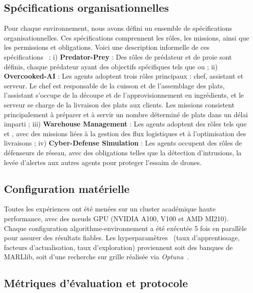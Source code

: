 \documentclass[francais,ROIA,Unicode,manuscript]{cedram}
\begin{document}
\subsection{Spécifications organisationnelles}

Pour chaque environnement, nous avons défini un ensemble de spécifications organisationnelles. Ces spécifications comprennent les rôles, les missions, ainsi que les permissions et obligations. Voici une description informelle de ces spécifications~\hyperref[fn:github]{\footnotemark[2]} :
%
i) \textbf{Predator-Prey} : Des rôles de prédateur et de proie sont définis, chaque prédateur ayant des objectifs spécifiques tels que  ou 
; \quad
ii) \textbf{Overcooked-AI} : Les agents adoptent trois rôles principaux : chef, assistant et serveur. Le chef est responsable de la cuisson et de l'assemblage des plats, l'assistant s'occupe de la découpe et de l'approvisionnement en ingrédients, et le serveur se charge de la livraison des plats aux clients. Les missions consistent principalement à préparer et à servir un nombre déterminé de plats dans un délai imparti
; \quad
iii) \textbf{Warehouse Management} : Les agents adoptent des rôles tels que  et , avec des missions liées à la gestion des flux logistiques et à l'optimisation des livraisons
; \quad
iv) \textbf{Cyber-Defense Simulation} : Les agents occupent des rôles de défenseurs de réseau, avec des obligations telles que la détection d'intrusions, la levée d'alertes aux autres agents pour proteger l'essaim de drones.

\subsection{Configuration matérielle}

Toutes les expériences ont été menées sur un cluster académique haute performance, avec des nœuds GPU (NVIDIA A100, V100 et AMD MI210). Chaque configuration algorithme-environnement a été exécutée 5 fois en parallèle pour assurer des résultats fiables.
Les hyperparamètres~\hyperref[fn:github]{\footnotemark[2]} (taux d'apprentissage, facteurs d'actualisation, taux d'exploration) proviennent soit des banques de MARLlib, soit d’une recherche sur grille réalisée via \textit{Optuna}~\cite{akiba2019optuna}.

\subsection{Métriques d'évaluation et protocole}
\end{document}
